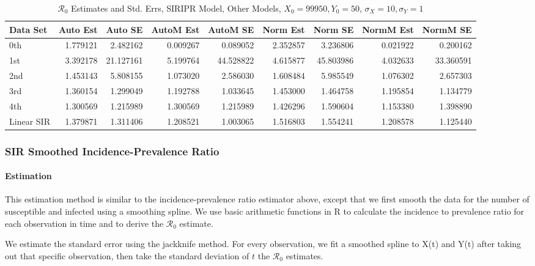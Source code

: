\documentclass[12pt]{article}
\newcommand{\rr}{\ensuremath{\mathcal{R}_0}}
\begin{document}
\begin{table}[H]
	
	\caption{$\rr$ Estimates and Std. Errs, SIRIPR Model,
		Other Models, $X_0 = 99950, Y_0 = 50$, 
		$\sigma_X = 10, \sigma_Y = 1$}
	\begin{footnotesize}
		\hskip -1cm
		\begin{tabular}{l|r|r|r|r|r|r|r|r}
			\hline
			Data Set & Auto Est & Auto SE & AutoM Est & AutoM SE & Norm Est & Norm SE & NormM Est & NormM SE\\
			\hline
			0th & 1.779121 & 2.482162 & 0.009267 & 0.089052 & 2.352857 & 3.236806 & 0.021922 & 0.200162\\
			\hline
			1st & 3.392178 & 21.127161 & 5.199764 & 44.528822 & 4.615877 & 45.803986 & 4.032633 & 33.360591\\
			\hline
			2nd & 1.453143 & 5.808155 & 1.073020 & 2.586030 & 1.608484 & 5.985549 & 1.076302 & 2.657303\\
			\hline
			3rd & 1.360154 & 1.299049 & 1.192788 & 1.033645 & 1.453000 & 1.464758 & 1.195854 & 1.134779\\
			\hline
			4th & 1.300569 & 1.215989 & 1.300569 & 1.215989 & 1.426296 & 1.590604 & 1.153380 & 1.398890\\
			\hline
			Linear SIR & 1.379871 & 1.311406 & 1.208521 & 1.003065 & 1.516803 & 1.554241 & 1.208578 & 1.125440\\
			\hline
		\end{tabular}
	\end{footnotesize}
\end{table}

\subsubsection{SIR Smoothed Incidence-Prevalence Ratio}

\paragraph{Estimation}

This estimation method is similar to the incidence-prevalence ratio estimator above, except that we first smooth the data for the number of susceptible and infected using a smoothing spline. We use basic arithmetic functions in R to calculate the incidence to prevalence ratio for each observation in time and to derive the $\rr$ estimate.

We estimate the standard error using the jackknife method. For every observation, we fit a smoothed spline to X(t) and Y(t) after taking out that specific observation, then take the standard deviation of $t$ the $\rr$ estimates. 
\end{document}
